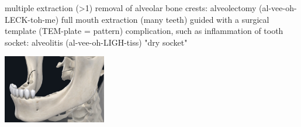 \documentclass[
paper=landscape,
paper=160mm:90mm, %
fontsize=11pt, %
pagesize, %
parskip=half-, %
]{scrartcl} %
\theoremstyle{mythmstyle} %
\begin{document}
\clearpage

\begin{minipage}[c]{0.45\linewidth}
\begin{outline}
\1 multiple extraction (>1)
\2 removal of alveolar bone crests: alveolectomy (al-vee-oh-LECK-toh-me)
\1 full mouth extraction (many teeth)
\2 guided with a surgical template  (TEM-plate = pattern)
\0 complication, such as
\1 inflammation of tooth socket: alveolitis (al-vee-oh-LIGH-tiss)
\1 "dry socket"

\end{outline}
\end{minipage}
\begin{minipage}[c]{0.5\linewidth}

\includegraphics[width=4.5cm]{8272E96F-2F4C-4CA3-819B-C93D7E515B20.jpeg}

\end{minipage}
\end{document}

